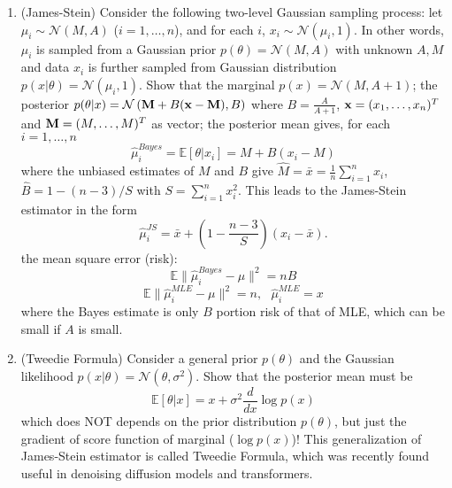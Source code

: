 \documentclass[11pt]{article}
\def\E{{\mathbb E}}
\begin{document}
\begin{enumerate}
\begin{enumerate}
\item (James-Stein) Consider the following two-level Gaussian sampling process: let $\mu_i \sim \mathcal{N}(M,A)$ ($i=1,\ldots, n$), and for each $i$, $x_i\sim \mathcal{N}(\mu_i,1)$. In other words, $\mu_i$ is sampled from a Gaussian prior $ p(\theta) = \mathcal{N}(M,A)$ with unknown $A,M$ and data $x_i$ is further sampled from Gaussian distribution $p(x|\theta)=\mathcal{N}(\mu_i,1)$. Show that 
\subitem[i.] the marginal $p(x) = \mathcal{N}(M, A+1)$; 
\subitem[ii.] the posterior $p(\theta | x) = \mathcal{N}\left( {\bf M}+B({\bf x}-{\bf M}), B\right)$ where $B=\frac{A}{A+1}$, ${\bf x}=(x_1,\ldots,x_n)^T$ and ${\bf M}=(M,\ldots, M)^T$ as vector;
\subitem[iii.] the posterior mean gives, for each $i=1,\ldots,n$
\[ \widehat{\mu}_i^{Bayes} = \E[\theta | x_i] = M + B(x_i-M) 
\] 
where the unbiased estimates of $M$ and $B$ give $\widehat{M}=\bar{x}=\frac{1}{n}\sum_{i=1}^n x_i$, $\widehat{B}=1-(n-3)/S$ with $S = \sum_{i=1}^n x_i^2$. This leads to the James-Stein estimator in the form 
\[  \widehat{\mu}^{JS}_i =  \bar{x} + \left(1- \frac{n-3 }{S} \right) (x_i - \bar{x}) .
\] 
\subitem[iv.] the mean square error (risk):
\[ \E\|  \widehat{\mu}_i^{Bayes}  - \mu\|^2 = n B \]
\[ \E\|  \widehat{\mu}_i^{MLE}  - \mu\|^2 =n,  \ \ \ \widehat{\mu}_i^{MLE} =x \]
where the Bayes estimate is only $B$ portion risk of that of MLE, which can be small if $A$ is small. 
\item (Tweedie Formula) Consider a general prior $p(\theta)$ and the Gaussian likelihood $p(x|\theta) = \mathcal{N}(\theta,\sigma^2)$. Show that the posterior mean must be
\begin{equation} 
\E[\theta | x] = x + \sigma^2 \frac{d}{dx} \log p(x) 
\end{equation} 
which does NOT depends on the prior distribution $p(\theta)$, but just the gradient of score function of marginal ($\log p(x)$)!  This generalization of James-Stein estimator is called Tweedie Formula, which was recently found useful in denoising diffusion models and transformers.
\end{enumerate}


\end{enumerate}
\end{document}
